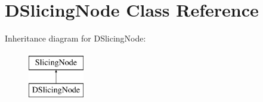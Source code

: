 \hypertarget{class_open_chams_1_1_d_slicing_node}{}\section{D\+Slicing\+Node Class Reference}
\label{class_open_chams_1_1_d_slicing_node}
Inheritance diagram for D\+Slicing\+Node\+:\begin{figure}[H]
\begin{center}
\leavevmode
\includegraphics[height=2.000000cm]{class_open_chams_1_1_d_slicing_node}
\end{center}
\end{figure}
